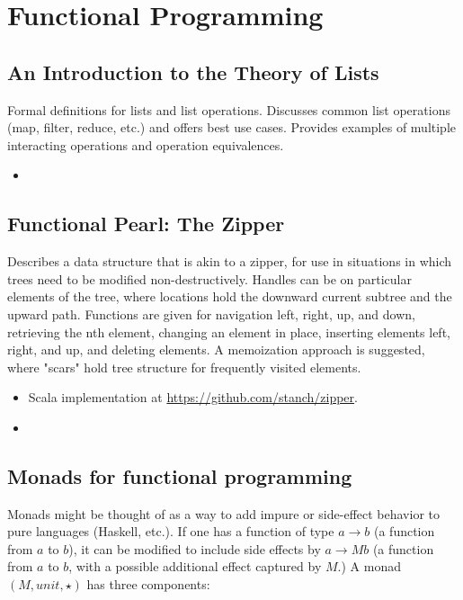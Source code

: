 \chapter {Functional Programming}

\section {An Introduction to the Theory of Lists \cite{bird1987introduction}}
Formal definitions for lists and list operations. Discusses common list
operations (map, filter, reduce, etc.) and offers best use cases. Provides
examples of multiple interacting operations and operation equivalences.
\begin{itemize}
    \item {}
\end{itemize}

\section {Functional Pearl: The Zipper \cite{huet1997zipper}}
Describes a data structure that is akin to a zipper, for use in situations in
which trees need to be modified non-destructively. Handles can be on particular
elements of the tree, where locations hold the downward current subtree and the
upward path. Functions are given for navigation left, right, up, and down,
retrieving the nth element, changing an element in place, inserting elements
left, right, and up, and deleting elements. A memoization approach is suggested,
where "scars" hold tree structure for frequently visited elements.
\begin{itemize}
    \item Scala implementation at \href{https://github.com/stanch/zipper}{https://github.com/stanch/zipper}.
    \item {}
\end{itemize}

\section{Monads for functional programming \cite{wadler1995monads}}
Monads might be thought of as a way to add impure or side-effect behavior to
pure languages (Haskell, etc.). If one has a function of type $a \rightarrow b$
(a function from $a$ to $b$), it can be modified to include side effects by
$a \rightarrow M b$ (a function from $a$ to $b$, with a possible additional
effect captured by $M$.) A monad $(M, \mathit{unit}, \star)$ has three
components:

